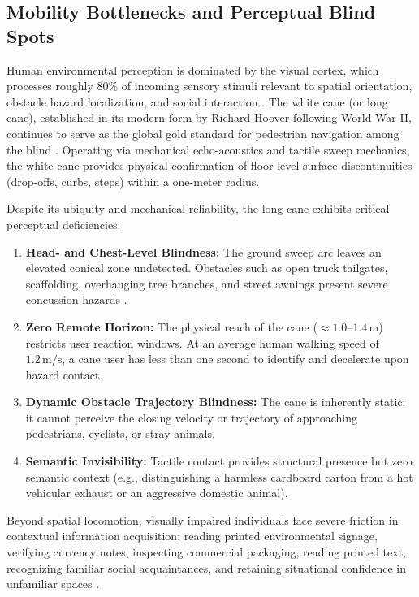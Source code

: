 \documentclass[10pt,twocolumn]{article}
\begin{document}
\subsection{Mobility Bottlenecks and Perceptual Blind Spots}
Human environmental perception is dominated by the visual cortex, which processes roughly 80\% of incoming sensory stimuli relevant to spatial orientation, obstacle hazard localization, and social interaction \cite{loomis2001visual}. The white cane (or long cane), established in its modern form by Richard Hoover following World War II, continues to serve as the global gold standard for pedestrian navigation among the blind \cite{hoover1944foot}. Operating via mechanical echo-acoustics and tactile sweep mechanics, the white cane provides physical confirmation of floor-level surface discontinuities (drop-offs, curbs, steps) within a one-meter radius.

Despite its ubiquity and mechanical reliability, the long cane exhibits critical perceptual deficiencies:
\begin{enumerate}[leftmargin=*]
    \item \textbf{Head- and Chest-Level Blindness:} The ground sweep arc leaves an elevated conical zone undetected. Obstacles such as open truck tailgates, scaffolding, overhanging tree branches, and street awnings present severe concussion hazards \cite{bhowmick2017vision}.
    \item \textbf{Zero Remote Horizon:} The physical reach of the cane ($\approx 1.0$--$1.4\,\text{m}$) restricts user reaction windows. At an average human walking speed of $1.2\,\text{m/s}$, a cane user has less than one second to identify and decelerate upon hazard contact.
    \item \textbf{Dynamic Obstacle Trajectory Blindness:} The cane is inherently static; it cannot perceive the closing velocity or trajectory of approaching pedestrians, cyclists, or stray animals.
    \item \textbf{Semantic Invisibility:} Tactile contact provides structural presence but zero semantic context (e.g., distinguishing a harmless cardboard carton from a hot vehicular exhaust or an aggressive domestic animal).
\end{enumerate}

Beyond spatial locomotion, visually impaired individuals face severe friction in contextual information acquisition: reading printed environmental signage, verifying currency notes, inspecting commercial packaging, reading printed text, recognizing familiar social acquaintances, and retaining situational confidence in unfamiliar spaces \cite{kalia2010spatial, brady2013visual}.
\end{document}
